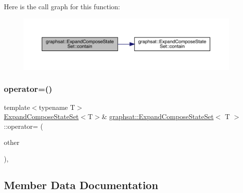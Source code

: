 Here is the call graph for this function\+:\nopagebreak
\begin{figure}[H]
\begin{center}
\leavevmode
\includegraphics[width=350pt]{classgraphsat_1_1_expand_compose_state_set_a5a2ee34354897e737fff3162fd25d791_cgraph}
\end{center}
\end{figure}
\mbox{\label{classgraphsat_1_1_expand_compose_state_set_a4aca81b4114f9721755ef068fd7ff9d5}} 
\subsubsection{\texorpdfstring{operator=()}{operator=()}}
{\footnotesize\ttfamily template$<$typename T$>$ \\
\mbox{\hyperlink{classgraphsat_1_1_expand_compose_state_set}{Expand\+Compose\+State\+Set}}$<$T$>$\& \mbox{\hyperlink{classgraphsat_1_1_expand_compose_state_set}{graphsat\+::\+Expand\+Compose\+State\+Set}}$<$ T $>$\+::operator= (\begin{DoxyParamCaption}\item[{const \mbox{\hyperlink{classgraphsat_1_1_expand_compose_state_set}{Expand\+Compose\+State\+Set}}$<$ T $>$ \&}]{other }\end{DoxyParamCaption})\hspace{0.3cm}{\ttfamily [inline]}, {\ttfamily [private]}}



\subsection{Member Data Documentation}
\mbox{\label{classgraphsat_1_1_expand_compose_state_set_a77327c86889a6eeca113a9d4af72049c}} 
